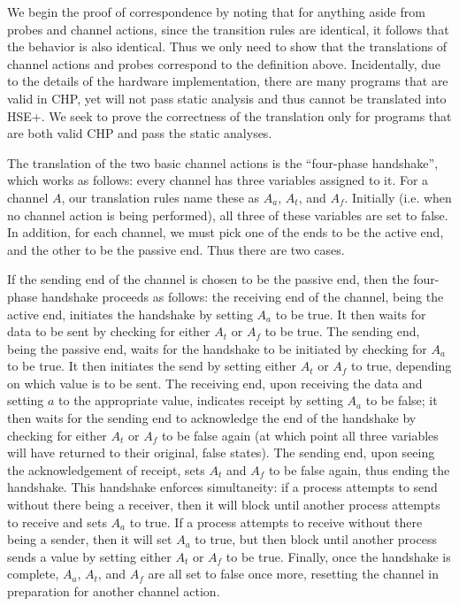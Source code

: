 \documentclass[times, 10pt]{article}
\begin{document}
\vspace{0.1in}

We begin the proof of correspondence by noting that for anything aside from
probes and channel actions, since the transition rules are identical, it follows
that the behavior is also identical. Thus we only need to show that the
translations of channel actions and probes correspond to the definition above.
Incidentally, due to the details of the hardware implementation, there are many
programs that are valid in CHP, yet will not pass static analysis and thus
cannot be translated into HSE+. We seek to prove the correctness of the
translation only for programs that are both valid CHP and pass the static
analyses.

The translation of the two basic channel actions is the ``four-phase
handshake'', which works as follows: every channel has three variables assigned
to it. For a channel $A$, our translation rules name these as $A_a$, $A_t$, and
$A_f$. Initially (i.e. when no channel action is being performed), all three of
these variables are set to false. In addition, for each channel, we must pick
one of the ends to be the active end, and the other to be the passive end. Thus
there are two cases.

If the sending end of the channel is chosen to be the passive end, then the
four-phase handshake proceeds as follows: the receiving end of the channel,
being the active end, initiates the handshake by setting $A_a$ to be true.  It
then waits for data to be sent by checking for either $A_t$ or $A_f$ to be true.
The sending end, being the passive end, waits for the handshake to be initiated
by checking for $A_a$ to be true. It then initiates the send by setting either
$A_t$ or $A_f$ to true, depending on which value is to be sent. The receiving
end, upon receiving the data and setting $a$ to the appropriate value, indicates
receipt by setting $A_a$ to be false; it then waits for the sending end to
acknowledge the end of the handshake by checking for either $A_t$ or $A_f$ to be
false again (at which point all three variables will have returned to their
original, false states). The sending end, upon seeing the acknowledgement of
receipt, sets $A_t$ and $A_f$ to be false again, thus ending the handshake. This
handshake enforces simultaneity: if a process attempts to send without there
being a receiver, then it will block until another process attempts to receive
and sets $A_a$ to true. If a process attempts to receive without there being a
sender, then it will set $A_a$ to true, but then block until another process
sends a value by setting either $A_t$ or $A_f$ to be true. Finally, once the
handshake is complete, $A_a$, $A_t$, and $A_f$ are all set to false once more,
resetting the channel in preparation for another channel action.
\end{document}
